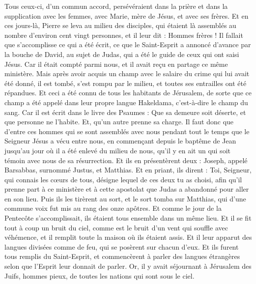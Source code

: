\begin{multicols}{2}
Tous ceux-ci, d’un commun accord, persévéraient dans la prière et dans la supplication avec les femmes, avec Marie, mère de Jésus, et avec ses frères.
Et en ces jours-là, Pierre se leva au milieu des disciples, qui étaient là assemblés au nombre d'environ cent vingt personnes, et il leur dit :
Hommes frères ! Il fallait que s’accomplisse ce qui a été écrit, ce que le Saint-Esprit a annoncé d’avance par la bouche de David, au sujet de Judas, qui a été le guide de ceux qui ont saisi Jésus.
Car il était compté parmi nous, et il avait reçu en partage ce même ministère.
Mais après avoir acquis un champ avec le salaire du crime qui lui avait été donné, il est tombé, s’est rompu par le milieu, et toutes ses entrailles ont été répandues.
Et ceci a été connu de tous les habitants de Jérusalem, de sorte que ce champ a été appelé dans leur propre langue Hakeldama, c'est-à-dire le champ du sang.
Car il est écrit dans le livre des Psaumes : Que sa demeure soit déserte, et que personne ne l’habite. Et, qu'un autre prenne sa charge.
Il faut donc que d’entre ces hommes qui se sont assemblés avec nous pendant tout le temps que le Seigneur Jésus a vécu entre nous,
en commençant depuis le baptême de Jean jusqu'au jour où il a été enlevé du milieu de nous, qu’il y en ait un qui soit témoin avec nous de sa résurrection.
Et ils en présentèrent deux : Joseph, appelé Barsabbas, surnommé Justus, et Matthias.
Et en priant, ils dirent : Toi, Seigneur, qui connais les cœurs de tous, désigne lequel de ces deux tu as choisi,
afin qu'il prenne part à ce ministère et à cette apostolat que Judas a abandonné pour aller en son lieu.
Puis ils les tirèrent au sort, et le sort tomba sur Matthias, qui d'une commune voix fut mis au rang des onze apôtres.
\VerseOne{}Et comme le jour de la Pentecôte s'accomplissait, ils étaient tous ensemble dans un même lieu.
Et il se fit tout à coup un bruit du ciel, comme est le bruit  d’un vent qui souffle avec véhémence, et il remplit toute la maison où ils étaient assis.
Et il leur apparut des langues divisées comme de feu, qui se posèrent sur chacun d’eux.
Et ils furent tous remplis du Saint-Esprit, et commencèrent à parler des langues étrangères selon que l'Esprit leur donnait de parler.
Or, il y avait séjournant à Jérusalem des Juifs, hommes pieux, de toutes les nations qui sont sous le ciel.

\end{multicols}
